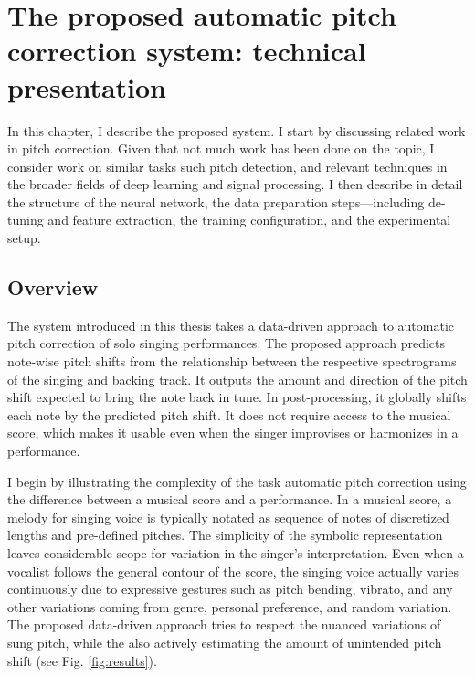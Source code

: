 \chapter{The proposed automatic pitch correction system: technical presentation}
\label{chap:thesis-autotuner}
In this chapter, I describe the proposed system\cite{wager2020deep}. I start by discussing related work in pitch correction. Given that not much work has been done on the topic, I consider work on similar tasks such pitch detection, and relevant techniques in the broader fields of deep learning and signal processing. I then describe in detail the structure of the neural network, the data preparation steps---including de-tuning and feature extraction, the training configuration, and the experimental setup. 


\section{Overview}
The system introduced in this thesis takes a data-driven approach to automatic pitch correction of solo singing performances. The proposed approach predicts note-wise pitch shifts from the relationship between the respective spectrograms of the singing and backing track. It outputs the amount and direction of the pitch shift expected to bring the note back in tune. In post-processing, it globally shifts each note by the predicted pitch shift. It does not require access to the musical score, which makes it usable even when the singer improvises or harmonizes in a performance.

I begin by illustrating the complexity of the task automatic pitch correction using the difference between a musical score and a performance. In a musical score, a melody for singing voice is typically notated as sequence of notes of discretized lengths and pre-defined pitches. The simplicity of the symbolic representation leaves considerable scope for variation in the singer's interpretation. Even when a vocalist follows the general contour of the score, the singing voice actually varies continuously due to expressive gestures such as pitch bending, vibrato, and any other variations coming from genre, personal preference, and random variation. The proposed data-driven approach tries to respect the nuanced variations of sung pitch, while the also actively estimating the amount of unintended pitch shift (see Fig. \ref{fig:results}).

